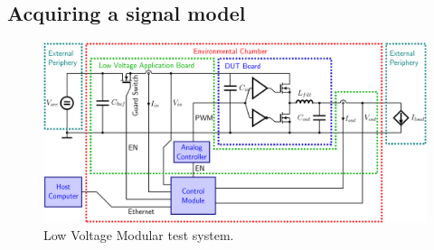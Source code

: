 \subsection{Acquiring a signal model}\label{sec:SM}	
	\begin{figure}
	\centering
	\includegraphics[trim=0 0 0 0, clip, width=\textwidth]{images/LV_module_2.png}
	\caption{Low Voltage Modular test system.}
	\label{fig:LVMTS}
	\end{figure}

